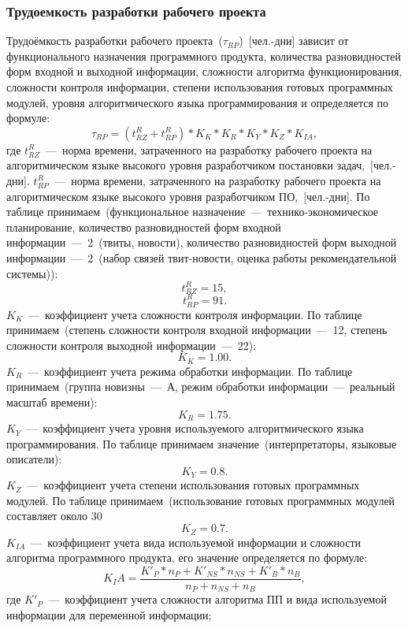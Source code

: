         \subsubsection{Трудоемкость разработки рабочего проекта}
            Трудоёмкость разработки рабочего проекта~($\tau_{RP}$)~[чел.-дни] зависит от функционального назначения программного продукта, количества разновидностей форм входной и выходной информации, сложности алгоритма функционирования, сложности контроля информации, степени использования готовых программных модулей, уровня алгоритмического языка программирования и определяется по формуле:
            $$\tau_{RP} = (t^R_{RZ} + t^R_{RP})*K_K*K_R*K_Y*K_Z*K_{IA},$$
            где $t^R_{RZ}$~---~норма времени, затраченного на разработку рабочего проекта на алгоритмическом языке высокого уровня разработчиком постановки задач,~[чел.-дни].
            $t^R_{RP}$~---~норма времени, затраченного на разработку рабочего проекта на алгоритмическом языке высокого уровня разработчиком ПО,~[чел.-дни].
            По таблице принимаем~(функциональное назначение~---~технико-экономическое планирование,
            количество разновидностей форм входной информации~---~2~(твиты, новости),
            количество разновидностей форм выходной информации~---~2~(набор связей твит-новости, оценка работы рекомендательной системы)):
            $$t^R_{RZ} = 15,$$
            $$t^R_{RP} = 91.$$
            $K_K$~---~коэффициент учета сложности контроля информации.
            По таблице принимаем~(степень сложности контроля входной информации~---~12, степень сложности контроля выходной информации~---~22):
            $$K_K = 1.00.$$
            $K_R$~---~коэффициент учета режима обработки информации.
            По таблице принимаем~(группа новизны~---~А, режим обработки информации~---~реальный масштаб времени):
            $$K_R = 1.75.$$
            $K_Y$~---~коэффициент учета уровня используемого алгоритмического языка программирования. По таблице принимаем значение~(интерпретаторы, языковые описатели):
            $$K_Y = 0.8.$$
            $K_Z$~---~коэффициент учета степени использования готовых программных модулей. По таблице принимаем~(использование готовых программных модулей составляет около 30%
            $$K_Z = 0.7.$$
            $K_{IA}$~---~коэффициент учета вида используемой информации и сложности алгоритма программного продукта, его значение определяется по формуле:
            $$K_IA = \dfrac {K'_P*n_P + K'_{NS}*n_{NS} + K'_B*n_B} {n_P + n_{NS} + n_B },$$
            где $K'_P$~---~коэффициент учета сложности алгоритма ПП и вида используемой информации для переменной информации;
